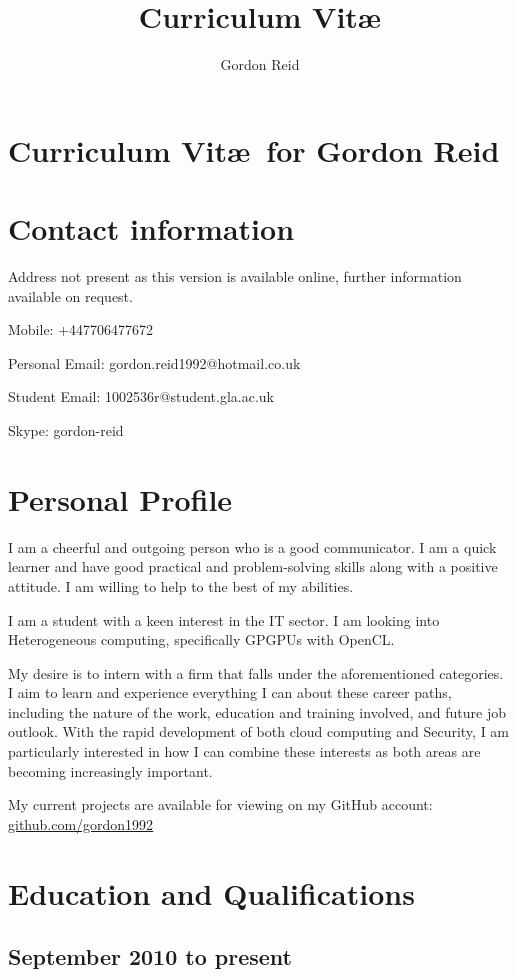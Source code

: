 \documentclass[11pt,a4paper]{article}
\title{Curriculum Vit\ae}
\author{Gordon Reid}
\begin{document}
\section*{Curriculum Vit\ae\ for Gordon Reid}
\section*{Contact information}
Address not present as this version is available online, further information
available on request.

Mobile: +447706477672

Personal Email: gordon.reid1992@hotmail.co.uk

Student Email: 1002536r@student.gla.ac.uk

Skype: gordon-reid


\section*{Personal Profile}

I am a cheerful and outgoing person who is a good communicator. I am a quick
learner and have good practical and problem-solving skills along with a
positive attitude. I am willing to help to the best of my abilities.

I am a student with a keen interest in the IT sector. I am looking into
Heterogeneous computing, specifically GPGPUs with OpenCL.

My desire is to intern with a firm that falls under the aforementioned
categories. I aim to learn and experience everything I can about these
career paths, including the nature of the work, education and training
involved, and future job outlook. With the rapid development of both cloud
computing and Security, I am particularly interested in how I can combine these
interests as both areas are becoming increasingly important.

My current projects are available for viewing on my GitHub account: \url{github.com/gordon1992}

\section*{Education and Qualifications}

\subsection*{September 2010 to present}
\end{document}
